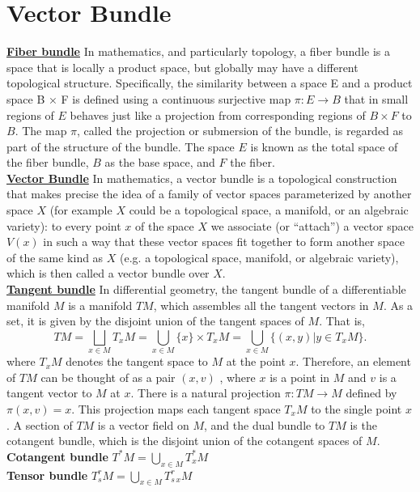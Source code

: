 \section{Vector Bundle}
\begin{newdef}
\href{https://en.wikipedia.org/wiki/Fiber_bundle}{\textbf{Fiber bundle}} In mathematics, and particularly topology, a fiber bundle is a space that is locally a product space, but globally may have a different topological structure. Specifically, the similarity between a space E and a product space B × F is defined using a continuous surjective map $\pi :E \to B$ that in small regions of $E$ behaves just like a projection from corresponding regions of $B \times F$ to $B$. The map $\pi$, called the projection or submersion of the bundle, is regarded as part of the structure of the bundle. The space $E$ is known as the total space of the fiber bundle, $B$ as the base space, and $F$ the fiber.\\
\href{https://en.wikipedia.org/wiki/Vector_bundle}{\textbf{Vector Bundle}} 
In mathematics, a vector bundle is a topological construction that makes precise the idea of a family of vector spaces parameterized by another space $X$ (for example $X$ could be a topological space, a manifold, or an algebraic variety): to every point $x$ of the space $X$ we associate (or ``attach'') a vector space $V(x)$ in such a way that these vector spaces fit together to form another space of the same kind as $X$ (e.g. a topological space, manifold, or algebraic variety), which is then called a vector bundle over $X$.\\
\href{https://en.wikipedia.org/wiki/Tangent_bundle}{\textbf{Tangent bundle}} 
In differential geometry, the tangent bundle of a differentiable manifold $M$ is a manifold $TM$, which assembles all the tangent vectors in $M$. As a set, it is given by the disjoint union of the tangent spaces of $M$. That is,
\[
TM = \bigsqcup_{x \in M}T_xM = \bigcup_{x \in M} \{x\} \times T_xM = \bigcup_{x \in M}\{(x,y)| y \in T_xM \}
.\]
where $T_xM$ denotes the tangent space to $M$ at the point $x$. Therefore, an element of $TM$ can be thought of as a pair $(x,v)$ , where $x$ is a point in $M$ and $v$ is a tangent vector to $M$ at $x$. There is a natural projection $\pi : TM \to M$ defined by $\pi(x,v) = x$. This projection maps each tangent space $T_xM$ to the single point $x$. A section of $TM$ is a vector field on $M$, and the dual bundle to $TM$ is the cotangent bundle, which is the disjoint union of the cotangent spaces of $M$.\\
\textbf{Cotangent bundle} $T^*M = \bigcup_{x \in M} T^*_xM$\\
\textbf{Tensor bundle} $T^r_sM = \bigcup_{x \in M} T^{r}_{s\,x}M$\\
\end{newdef}



